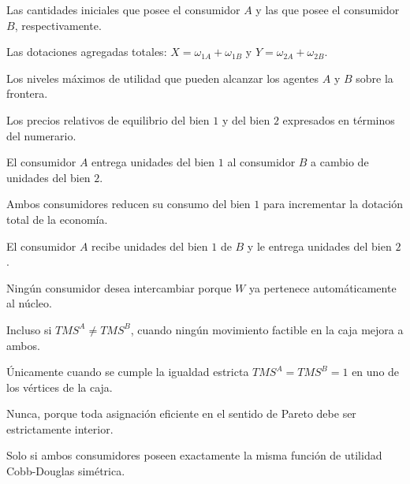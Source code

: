 \begin{opts}
    \item Las cantidades iniciales que posee el consumidor $A$ y las que posee el consumidor $B$, respectivamente.
    \item Las dotaciones agregadas totales: $X = \omega_{1A} + \omega_{1B}$ y $Y = \omega_{2A} + \omega_{2B}$.
    \item Los niveles máximos de utilidad que pueden alcanzar los agentes $A$ y $B$ sobre la frontera.
    \item Los precios relativos de equilibrio del bien $1$ y del bien $2$ expresados en términos del numerario.
\end{opts}

\begin{opts}
    \item El consumidor $A$ entrega unidades del bien $1$ al consumidor $B$ a cambio de unidades del bien $2$.
    \item Ambos consumidores reducen su consumo del bien $1$ para incrementar la dotación total de la economía.
    \item El consumidor $A$ recibe unidades del bien $1$ de $B$ y le entrega unidades del bien $2$.
    \item Ningún consumidor desea intercambiar porque $W$ ya pertenece automáticamente al núcleo.
\end{opts}

\begin{opts}
    \item Incluso si $TMS^A \neq TMS^B$, cuando ningún movimiento factible en la caja mejora a ambos.
    \item Únicamente cuando se cumple la igualdad estricta $TMS^A = TMS^B = 1$ en uno de los vértices de la caja.
    \item Nunca, porque toda asignación eficiente en el sentido de Pareto debe ser estrictamente interior.
    \item Solo si ambos consumidores poseen exactamente la misma función de utilidad Cobb-Douglas simétrica.
\end{opts}


